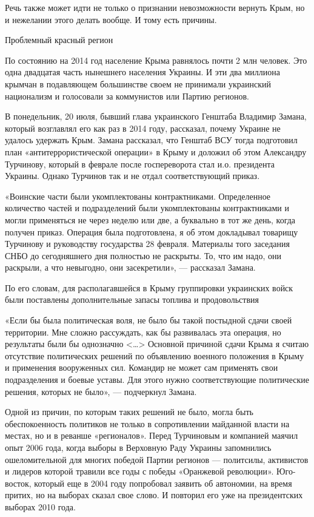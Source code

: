\documentclass[a4paper,11pt]{extreport}
\begin{document}
Речь также может идти не только о признании невозможности вернуть Крым, но и нежелании этого делать вообще. И тому есть причины.

Проблемный красный регион

По состоянию на 2014 год население Крыма равнялось почти 2 млн человек. Это одна двадцатая часть нынешнего населения Украины. И эти два миллиона крымчан в подавляющем большинстве своем не принимали украинский национализм и голосовали за коммунистов или Партию регионов.

В понедельник, 20 июля, бывший глава украинского Генштаба Владимир Замана, который возглавлял его как раз в 2014 году, рассказал, почему Украине не удалось удержать Крым. Замана рассказал, что Генштаб ВСУ тогда подготовил план «антитеррористической операции» в Крыму и доложил об этом Александру Турчинову, который в феврале после госпереворота стал и.о. президента Украины. Однако Турчинов так и не отдал соответствующий приказ.

«Воинские части были укомплектованы контрактниками. Определенное количество частей и подразделений были укомплектованы контрактниками и могли применяться не через неделю или две, а буквально в тот же день, когда получен приказ. Операция была подготовлена, я об этом докладывал товарищу Турчинову и руководству государства 28 февраля. Материалы того заседания СНБО до сегодняшнего дня полностью не раскрыты. То, что им надо, они раскрыли, а что невыгодно, они засекретили», --- рассказал Замана.

По его словам, для располагавшейся в Крыму группировки украинских войск были поставлены дополнительные запасы топлива и продовольствия

«Если бы была политическая воля, не было бы такой постыдной сдачи своей территории. Мне сложно рассуждать, как бы развивалась эта операция, но результаты были бы однозначно <…> Основной причиной сдачи Крыма я считаю отсутствие политических решений по объявлению военного положения в Крыму и применения вооруженных сил. Командир не может сам применять свои подразделения и боевые уставы. Для этого нужно соответствующие политические решения, которых не было», --- подчеркнул Замана.

Одной из причин, по которым таких решений не было, могла быть обеспокоенность политиков не только в сопротивлении майданной власти на местах, но и в реванше «регионалов». Перед Турчиновым и компанией маячил опыт 2006 года, когда выборы в Верховную Раду Украины запомнились ошеломительной для многих победой Партии регионов --- политсилы, активистов и лидеров которой травили все годы с победы «Оранжевой революции». Юго-восток, который еще в 2004 году попробовал заявить об автономии, на время притих, но на выборах сказал свое слово. И повторил его уже на президентских выборах 2010 года.
\end{document}
